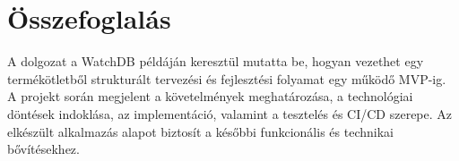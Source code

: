 \section{Összefoglalás}

A dolgozat a WatchDB példáján keresztül mutatta be, hogyan vezethet egy termékötletből strukturált tervezési és fejlesztési folyamat egy működő MVP-ig. A projekt során megjelent a követelmények meghatározása, a technológiai döntések indoklása, az implementáció, valamint a tesztelés és CI/CD szerepe. Az elkészült alkalmazás alapot biztosít a későbbi funkcionális és technikai bővítésekhez.

